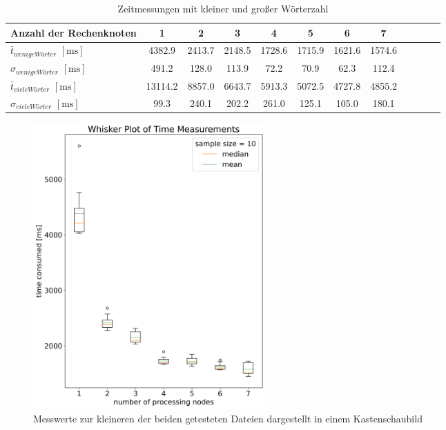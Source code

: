 \begin{table}
	\caption{Zeitmessungen mit kleiner und großer Wörterzahl}
	\label{zeiten_tabelle_lang_und_kurz}
	\begin{tabularx}{\textwidth}{@{}l*{10}{C}c@{}}
		\toprule
		Anzahl der Rechenknoten & 1 & 2 & 3 & 4 & 5 & 6 & 7 \\ 
		\midrule
		$\bar{t}_{wenige Wörter}$ $\mathrm{[ms]}$ & 4382.9 & 2413.7 & 2148.5 & 1728.6 & 1715.9 & 1621.6 & 1574.6 \\
		$\sigma_{wenige Wörter}$ $\mathrm{[ms]}$ & 491.2 & 128.0 & 113.9 & 72.2 & 70.9 & 62.3 & 112.4 \\
		\addlinespace
		$\bar{t}_{viele Wörter}$ $\mathrm{[ms]}$ & 13114.2 & 8857.0 & 6643.7 & 5913.3 & 5072.5 & 4727.8 & 4855.2 \\
		$\sigma_{viele Wörter}$ $\mathrm{[ms]}$ & 99.3 & 240.1 & 202.2 & 261.0 & 125.1 & 105.0 & 180.1 \\
		\bottomrule
	\end{tabularx}
\end{table}

\begin{figure}[!t]
    \centering
    \includegraphics[width=3.5in]{boxplots.png}
    \caption{Messwerte zur kleineren der beiden getesteten Dateien dargestellt in einem Kastenschaubild}
    \label{boxplot_times}
\end{figure}

